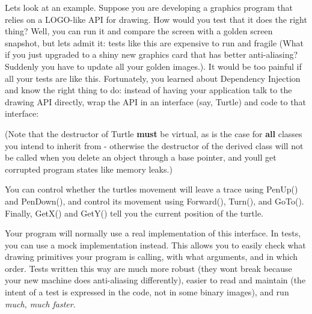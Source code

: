 Let\textquotesingle{}s look at an example. Suppose you are developing a graphics program that relies on a L\+O\+G\+O-\/like A\+PI for drawing. How would you test that it does the right thing? Well, you can run it and compare the screen with a golden screen snapshot, but let\textquotesingle{}s admit it\+: tests like this are expensive to run and fragile (What if you just upgraded to a shiny new graphics card that has better anti-\/aliasing? Suddenly you have to update all your golden images.). It would be too painful if all your tests are like this. Fortunately, you learned about Dependency Injection and know the right thing to do\+: instead of having your application talk to the drawing A\+PI directly, wrap the A\+PI in an interface (say, {\ttfamily Turtle}) and code to that interface\+:


\begin{DoxyCode}{0}
\DoxyCodeLine{\};}
\end{DoxyCode}


(Note that the destructor of {\ttfamily Turtle} {\bfseries{must}} be virtual, as is the case for {\bfseries{all}} classes you intend to inherit from -\/ otherwise the destructor of the derived class will not be called when you delete an object through a base pointer, and you\textquotesingle{}ll get corrupted program states like memory leaks.)

You can control whether the turtle\textquotesingle{}s movement will leave a trace using {\ttfamily Pen\+Up()} and {\ttfamily Pen\+Down()}, and control its movement using {\ttfamily Forward()}, {\ttfamily Turn()}, and {\ttfamily Go\+To()}. Finally, {\ttfamily Get\+X()} and {\ttfamily Get\+Y()} tell you the current position of the turtle.

Your program will normally use a real implementation of this interface. In tests, you can use a mock implementation instead. This allows you to easily check what drawing primitives your program is calling, with what arguments, and in which order. Tests written this way are much more robust (they won\textquotesingle{}t break because your new machine does anti-\/aliasing differently), easier to read and maintain (the intent of a test is expressed in the code, not in some binary images), and run {\itshape much, much faster}.


